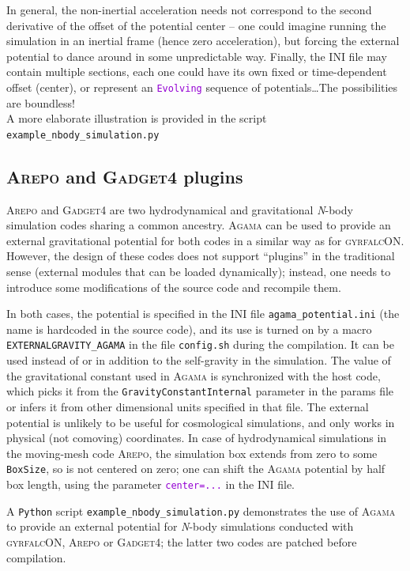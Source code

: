 \documentclass[12pt]{article}
\newcommand{\Agama}{\textsc{Agama}\xspace}
\newcommand{\Nbody}{\textsl{N}-body\xspace}
\newcommand{\Python}{\texttt{Python}\xspace}
\newcommand{\ttt}[1]{\textcolor{darkviolet}{\texttt{#1}}}
\begin{document}
In general, the non-inertial acceleration needs not correspond to the second derivative of the offset of the potential center -- one could imagine running the simulation in an inertial frame (hence zero acceleration), but forcing the external potential to dance around in some unpredictable way. Finally, the INI file may contain multiple sections, each one could have its own fixed or time-dependent offset (center), or represent an \ttt{Evolving} sequence of potentials\dots The possibilities are boundless!\\
A more elaborate illustration is provided in the script \texttt{example_nbody_simulation.py}


\subsection{\textsc{Arepo} and \textsc{Gadget4} plugins}  \label{sec:GadgetArepo}

\textsc{Arepo} \cite{Springel2010} and \textsc{Gadget4} \cite{Springel2021} are two hydrodynamical and gravitational \Nbody simulation codes sharing a common ancestry. \Agama can be used to provide an external gravitational potential for both codes in a similar way as for \textsc{gyrfalcON}. However, the design of these codes does not support ``plugins'' in the traditional sense (external modules that can be loaded dynamically); instead, one needs to introduce some modifications of the source code and recompile them. 

In both cases, the potential is specified in the INI file \texttt{agama_potential.ini} (the name is hardcoded in the source code), and its use is turned on by a macro \texttt{EXTERNALGRAVITY_AGAMA} in the file \texttt{config.sh} during the compilation. It can be used instead of or in addition to the self-gravity in the simulation. The value of the gravitational constant used in \Agama is synchronized with the host code, which picks it from the \texttt{GravityConstantInternal} parameter in the params file or infers it from other dimensional units specified in that file. The external potential is unlikely to be useful for cosmological simulations, and only works in physical (not comoving) coordinates. In case of hydrodynamical simulations in the moving-mesh code \textsc{Arepo}, the simulation box extends from zero to some \texttt{BoxSize}, so is not centered on zero; one can shift the \textsc{Agama} potential by half box length, using the parameter \ttt{center=...} in the INI file.

A \Python script \texttt{example_nbody_simulation.py} demonstrates the use of \Agama to provide an external potential for \Nbody simulations conducted with \textsc{gyrfalcON}, \textsc{Arepo} or \textsc{Gadget4}; the latter two codes are patched before compilation.
\end{document}
